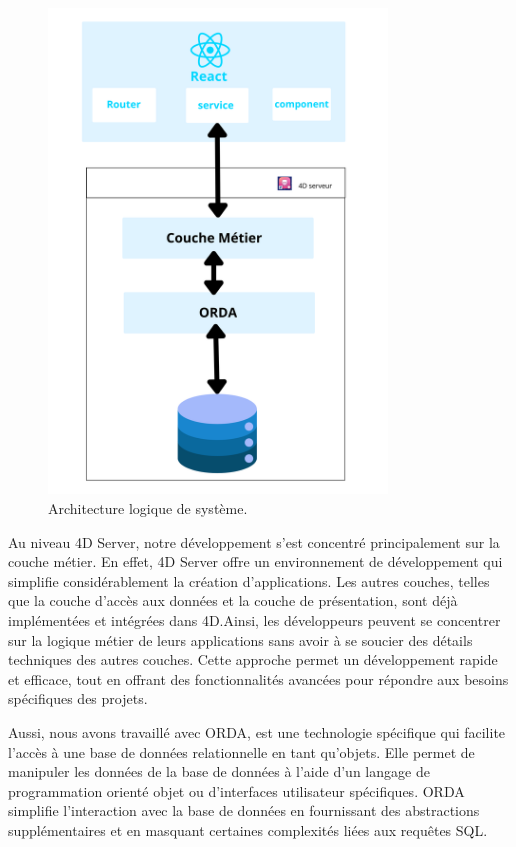 \begin{figure}[H]
    \centering
    \includegraphics[width=9cm]{Figures/architectureLogique.png}
    \caption{Architecture logique de système.}
\end{figure}

Au niveau 4D Server, notre développement s’est concentré principalement sur la couche
métier. En effet, 4D Server offre un environnement de développement qui simplifie considérablement la création d’applications. Les autres couches, telles que la couche d’accès
aux données et la couche de présentation, sont déjà implémentées et intégrées dans 4D.Ainsi, les développeurs peuvent se concentrer sur la logique métier de leurs applications
sans avoir à se soucier des détails techniques des autres couches. Cette approche permet
un développement rapide et efficace, tout en offrant des fonctionnalités avancées pour
répondre aux besoins spécifiques des projets.

Aussi, nous avons travaillé avec ORDA, est une technologie spécifique qui facilite
l’accès à une base de données relationnelle en tant qu’objets. Elle permet de manipuler les
données de la base de données à l’aide d’un langage de programmation orienté objet ou
d’interfaces utilisateur spécifiques. ORDA simplifie l’interaction avec la base de données
en fournissant des abstractions supplémentaires et en masquant certaines complexités liées
aux requêtes SQL.

